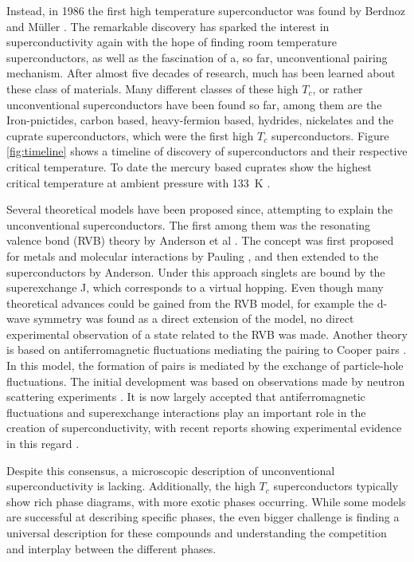 Instead, in 1986 the first high temperature superconductor was found by Berdnoz and Müller \cite{bednorz_possible_1986}.
The remarkable discovery has sparked the interest in superconductivity again with the hope of finding room temperature superconductors, as well as the fascination of a, so far, unconventional pairing mechanism.
After almost five decades of research, much has been learned about these class of materials.
Many different classes of these high $T_c$, or rather unconventional superconductors have been found so far, among them are the Iron-pnictides, carbon based, heavy-fermion based, hydrides, nickelates and the cuprate superconductors, which were the first high $T_c$ superconductors.
Figure \ref{fig:timeline} shows a timeline of discovery of superconductors and their respective critical temperature.
To date the mercury based cuprates show the highest critical temperature at ambient pressure with \qty{133}{\kelvin} \cite{schilling_superconductivity_1993}.

Several theoretical models have been proposed since, attempting to explain the unconventional superconductors.
The first among them was the resonating valence bond (RVB) theory by Anderson et al \cite{anderson_resonating_1973,anderson_resonating--valence-bond_1987}.
The concept was first proposed for metals and molecular interactions by Pauling \cite{pauling_nature_1938, pauling_nature_1948}, and then extended to the superconductors by Anderson.
Under this approach singlets are bound by the superexchange J, which corresponds to a virtual hopping.
Even though many theoretical advances could be gained from the RVB model, for example the d-wave symmetry was found as a direct extension of the model, no direct experimental observation of a state related to the RVB was made.
Another theory is based on antiferromagnetic fluctuations mediating the pairing to Cooper pairs \cite{bickers_cdw_1987}.
In this model, the formation of pairs is mediated by the exchange of particle-hole fluctuations.
The initial development was based on observations made by neutron scattering experiments \cite{mook_polarized_1993,hayden_structure_2004,dahm_strength_2009}.
It is now largely accepted that antiferromagnetic fluctuations and superexchange interactions play an important role in the creation of superconductivity, with recent reports showing experimental evidence in this regard \cite{kowalski_oxygen_2021,omahony_electron_2022}.

Despite this consensus, a microscopic description of unconventional superconductivity is lacking.
Additionally, the high $T_c$ superconductors typically show rich phase diagrams, with more exotic phases occurring.
While some models are successful at describing specific phases, the even bigger challenge is finding a universal description for these compounds and understanding the competition and interplay between the different phases.

